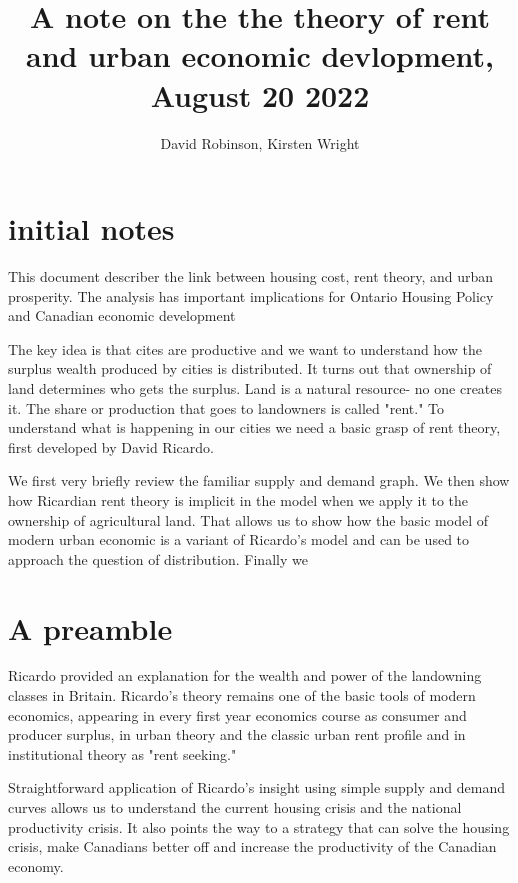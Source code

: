 \documentclass[11pt]{amsart}
\title{A note on the the theory of rent and urban economic devlopment, August 20 2022}%
\author{David Robinson, Kirsten Wright}
\begin{document}
\maketitle
\section{initial notes}
This document describer the link between housing cost, rent theory, and urban prosperity. The analysis has important implications for Ontario Housing Policy and Canadian economic development

The key idea is that cites are productive and we want to understand how the surplus wealth produced by cities is distributed.  It turns out that ownership of land determines  who gets the surplus. Land is a natural resource- no one creates it. The share or production that goes to landowners is called "rent." To  understand what is happening in our cities we need a basic grasp of  rent theory, first developed by David Ricardo. 

We first very briefly review the familiar supply and demand graph. We then show how Ricardian rent theory is implicit in the model when we apply it to  the ownership of agricultural land. That allows us to show how the basic model of modern urban economic is a variant of Ricardo's model and can be used to approach the question of distribution. Finally we 

\section{A preamble}
Ricardo provided an explanation for the wealth and power of the landowning classes in Britain. Ricardo's theory remains one of the basic tools of modern economics, appearing in every first year economics course as consumer and producer surplus, in urban theory and the classic urban rent profile and in institutional theory as  "rent seeking."

Straightforward application of Ricardo's insight using simple supply and demand curves allows us to understand the current housing crisis and the national productivity crisis. It also points the way to a strategy that can solve the housing crisis, make Canadians better off and increase the productivity of the Canadian economy.
\end{document}
